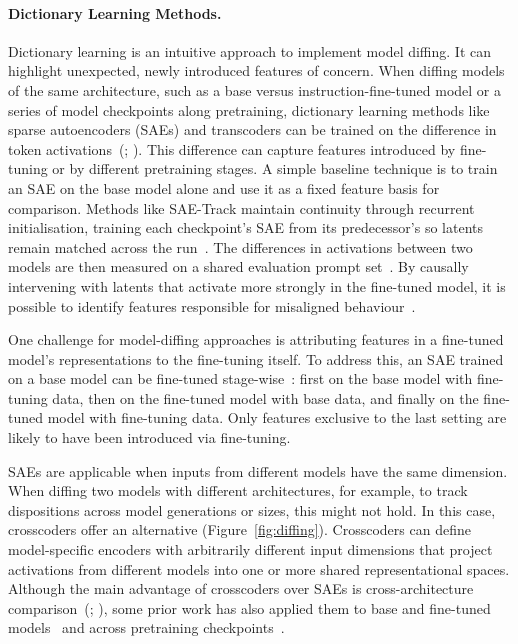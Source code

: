 \paragraph{Dictionary Learning Methods.} Dictionary learning is an intuitive approach to implement model diffing. It can highlight unexpected, newly introduced features of concern. When diffing models of the same architecture, such as a base versus instruction-fine-tuned model or a series of model checkpoints along pretraining, dictionary learning methods like sparse autoencoders (SAEs) and transcoders can be trained on the difference in token activations~(; ). This difference can capture features introduced by fine-tuning or by different pretraining stages. A simple baseline technique is to train an SAE on the base model alone and use it as a fixed feature basis for comparison. Methods like SAE-Track maintain continuity through recurrent initialisation, training each checkpoint's SAE from its predecessor's so latents remain matched across the run~. The differences in activations between two models are then measured on a shared evaluation prompt set~. By causally intervening with latents that activate more strongly in the fine-tuned model, it is possible to identify features responsible for misaligned behaviour~.

One challenge for model-diffing approaches is attributing features in a fine-tuned model's representations to the fine-tuning itself. To address this, an SAE trained on a base model can be fine-tuned stage-wise~: first on the base model with fine-tuning data, then on the fine-tuned model with base data, and finally on the fine-tuned model with fine-tuning data. Only features exclusive to the last setting are likely to have been introduced via fine-tuning.

SAEs are applicable when inputs from different models have the same dimension. When diffing two models with different architectures, for example, to track dispositions across model generations or sizes, this might not hold. In this case, crosscoders offer an alternative (Figure~\ref{fig:diffing}). Crosscoders can define model-specific encoders with arbitrarily different input dimensions that project activations from different models into one or more shared representational spaces. Although the main advantage of crosscoders over SAEs is cross-architecture comparison~(; ), some prior work has also applied them to base and fine-tuned models~ and across pretraining checkpoints~.

